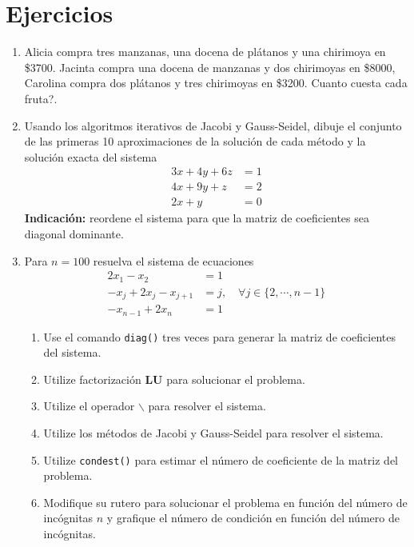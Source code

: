 \documentclass[letter,11pt]{article}
\begin{document}
\section{Ejercicios}
\begin{enumerate}
\item Alicia compra tres manzanas, una docena de pl\'atanos y una chirimoya en \$3700. Jacinta compra una docena de manzanas y dos chirimoyas en \$8000, Carolina compra dos pl\'atanos y tres chirimoyas en \$3200. \textquestiondown Cuanto cuesta cada fruta?.

\item Usando los algoritmos iterativos de Jacobi y Gauss-Seidel, dibuje el conjunto de las primeras 10 aproximaciones de la soluci\'on de cada m\'etodo y la soluci\'on exacta del sistema
$$
\begin{array}{rl}
3x+4y+6z	& = 1\\
4x+9y+z	& = 2\\
2x+y		& = 0
\end{array}
$$
\textbf{Indicaci\'on:} reordene el sistema para que la matriz de coeficientes sea diagonal dominante.

\item Para $n=100$ resuelva el sistema de ecuaciones
$$
\begin{array}{ll}
2x_1-x_2			&	=1\\
-x_j+2x_j-x_{j+1}	& 	=j , \quad \forall j\in\{2,\cdots,n-1\}\\
-x_{n-1}+2x_n		&	=1
\end{array}
$$
\begin{enumerate}
\item Use el comando \texttt{diag()} tres veces para generar la matriz de coeficientes del sistema.
\item Utilize factorizaci\'on \textbf{LU} para solucionar el problema.
\item Utilize el operador $\backslash$ para resolver el sistema.
\item Utilize los m\'etodos de Jacobi y Gauss-Seidel para resolver el sistema.
\item Utilize \texttt{condest()} para estimar el n\'umero de coeficiente de la matriz del problema.
\item Modifique su rutero para solucionar el problema en funci\'on del n\'umero de inc\'ognitas $n$ y grafique el n\'umero de condici\'on en funci\'on del n\'umero de inc\'ognitas.
\end{enumerate}



\end{enumerate}
\end{document}
